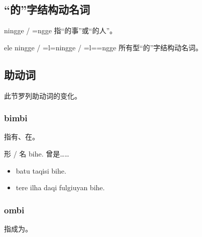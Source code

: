 \subsection{“的”字结构动名词}

\begin{des}
    \item[\V\ftn{形} ningge / \V\ftn{形}\!=ngge ] 指“\V 的事”或“\V 的人”。
    \item[\V\ftn{形} ele ningge / \V\ftn{形}=l=\AIfina ningge / \V\ftn{形}=l=\AImedi=ngge] 所有型“的”字结构动名词。
\end{des}

\subsection{助动词}

此节罗列助动词的变化。

\subsubsection{bimbi}

指有、在。

\begin{des}
    \item[形 / 名 bihe.] 曾是……
        \begin{itemize}
            \item batu  taqisi bihe.
            \item tere ilha daqi fulgiuyan bihe.
        \end{itemize}
\end{des}

\subsubsection{ombi}

指成为。

